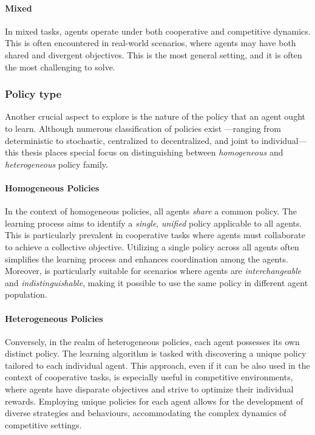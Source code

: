 \paragraph*{Mixed}
In mixed tasks, agents operate under both cooperative and competitive dynamics. 
 This is often encountered in real-world scenarios, 
 where agents may have both shared and divergent objectives. 
This is the most general setting, and it is often the most challenging to solve.
\subsubsection{Policy type}
Another crucial aspect to explore is the nature of the policy that an agent ought to learn. 
Although numerous classification of policies exist
 ---ranging from deterministic to stochastic, centralized to decentralized, and joint to individual---
 this thesis places special focus on distinguishing between \emph{homogeneous} and \emph{heterogeneous} policy family.

\paragraph*{Homogeneous Policies}
In the context of homogeneous policies, 
 all agents \emph{share} a common policy. 
 The learning process aims to identify a \emph{single}, \emph{unified} policy applicable to all agents. 
 This is particularly prevalent in cooperative tasks where agents must collaborate to achieve a collective objective. 
 Utilizing a single policy across all agents often simplifies the learning process and enhances coordination among the agents.
 Moreover, is particularly suitable for scenarios where agents are \emph{interchangeable} and \emph{indistinguishable}, 
 making it possible to use the same policy in different agent population.
\paragraph*{Heterogeneous Policies}
Conversely, in the realm of heterogeneous policies, 
 each agent possesses its own distinct policy. 
 The learning algorithm is tasked with discovering a unique policy tailored to each individual agent. 
 This approach, even if it can be also used in the context of cooperative tasks, 
 is especially useful in competitive environments, 
 where agents have disparate objectives and strive to optimize their individual rewards. 
 Employing unique policies for each agent allows for the development of diverse strategies and behaviours, 
 accommodating the complex dynamics of competitive settings.
